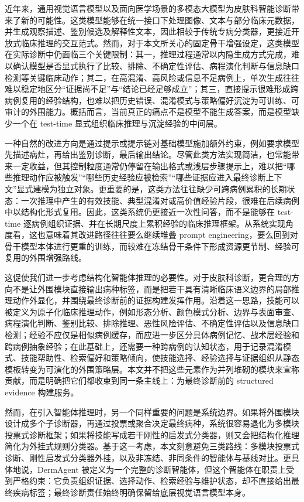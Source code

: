 \documentclass{article}
\begin{document}
近年来，通用视觉语言模型以及面向医学场景的多模态大模型为皮肤科智能诊断带来了新的可能性。这类模型能够在统一接口下处理图像、文本与部分临床元数据，并生成观察描述、鉴别候选及解释性文本，因此相较于传统专病分类器，更接近开放式临床推理的交互范式\citep{skingpt4_2024,panderm_2025,skingptr1_2025,skinr1_2025,skinflow_2026}。然而，对于本文所关心的固定骨干增强设定，这类模型在实际诊断中仍面临三个关键限制：其一，推理过程通常以内隐生成方式完成，难以确认模型是否显式执行了比较、排除、不确定性评估、病程演化判断与信息缺口检测等关键临床动作；其二，在高混淆、高风险或信息不足病例上，单次生成往往难以稳定地区分“证据尚不足”与“结论已经足够成立”；其三，直接提示很难形成跨病例复用的经验结构，也难以把历史错误、混淆模式与策略偏好沉淀为可训练、可审计的外围能力。概括而言，当前真正的痛点不是模型不能生成答案，而是模型缺少一个在 test-time 显式组织临床推理与沉淀经验的中间层。

一种自然的改进方向是通过提示或提示链对基础模型施加额外约束，例如要求模型先描述病灶，再给出鉴别诊断，最后输出结论。尽管此类方法实现简洁，也常能带来一定收益，但其控制粒度通常仍停留在输出格式或浅层步骤提示上，难以把“哪些推理动作应被触发”“哪些历史经验应被检索”“哪些证据应进入最终诊断上下文”显式建模为独立对象。更重要的是，这类方法往往缺少可跨病例累积的长期状态：一次推理中产生的有效技能、典型混淆对或高价值经验片段，很难在后续病例中以结构化形式复用。因此，这类系统仍更接近一次性问答，而不是能够在 test-time 逐病例组织证据、并在长期尺度上累积经验的临床推理框架\citep{xskill_2026,tarse_2026,autoagent_2026}。从系统实现角度看，这也意味着其改进路径往往要么继续堆叠 prompt engineering，要么回到对骨干模型本体进行更重的训练，而较难在冻结骨干条件下形成资源更节制、经验可复用的外围增强路线。

这促使我们进一步考虑结构化智能体推理的必要性。对于皮肤科诊断，更合理的方向不是让外围模块直接输出病种标签，而是把若干具有清晰临床语义边界的局部推理动作外显化，并围绕最终诊断前的证据构建发挥作用。沿着这一思路，技能可以被定义为原子化临床推理动作，例如形态分析、颜色模式分析、边界与表面审查、病程演化判断、鉴别比较、排除推理、恶性风险评估、不确定性评估以及信息缺口检测；经验不应仅是相似病例缓存，而应进一步区分具体病例记忆、战术层经验和跨病例抽象经验；在此基础上，还需要一种跨病例的认知状态，用于记录混淆模式、技能帮助性、检索偏好和策略倾向，使技能选择、经验选择与证据组织从静态模板转变为可演化的外围策略层\citep{xskill_2026,tarse_2026,macro_2026,memskill_2026,autoagent_2026}。本文并不把这些元素作为并列堆砌的模块来宣称贡献，而是明确把它们都收束到同一条主线上：为最终诊断前的 structured evidence 构建服务。

然而，在引入智能体推理时，另一个同样重要的问题是系统边界。如果将外围模块设计成多个子诊断器，再通过投票或聚合决定最终病种，系统很容易退化为多模块投票式诊断框架；如果将技能写成若干刚性的启发式分类器，则又会把结构化推理简化为外挂式规则分类器。基于这一考虑，本文刻意避免三类路线：多模块投票式诊断、刚性启发式分类器外挂，以及非冻结、非同条件的智能体与基线对比。更具体地说，DermAgent 被定义为一个完整的诊断智能体，但这个智能体在职责上受到严格约束：它负责组织证据、选择动作、检索经验与维护状态，却不直接给出最终疾病标签；最终诊断责任始终明确保留给底层视觉语言模型本身。
\end{document}
